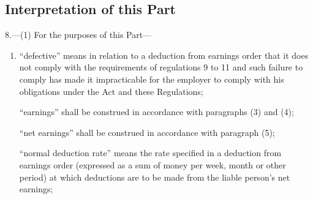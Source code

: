 \documentclass[12pt,a4paper]{article}
\begin{document}
\renewcommand\parthead{--- Part III}

\subsection[8. Interpretation of this Part]{Interpretation of this Part}

8.—(1) For the purposes of this Part—
\begin{enumerate}\item[]
“defective” means in relation to a deduction from earnings order that it does not comply with the requirements of regulations 9 to 11 and such failure to comply has made it impracticable for the employer to comply with his obligations under the Act and these Regulations;


“earnings” shall be construed in accordance with paragraphs (3) and (4);



“net earnings” shall be construed in accordance with paragraph (5);

“normal deduction rate” means the rate specified in a deduction from earnings order (expressed as a sum of money per week, month or other period) at which deductions are to be made from the liable person’s net earnings;


\end{enumerate}
\end{document}
